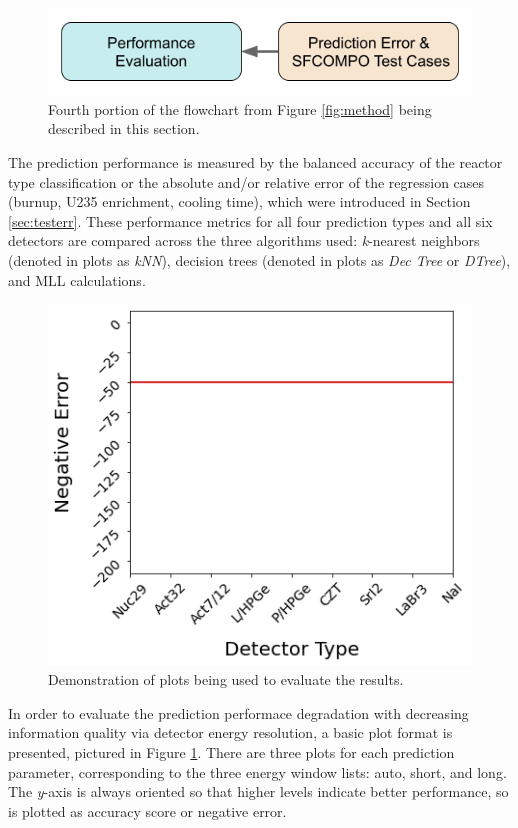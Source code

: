 

\begin{figure}[H]
  \centering
  \includegraphics[width=0.7\linewidth]{./chapters/exp1/methodology4.png}
  \caption{Fourth portion of the flowchart from Figure \ref{fig:method} being 
           described in this section.}
\end{figure}

The prediction performance is measured by the balanced accuracy of the reactor
type classification or the absolute and/or relative error of the regression
cases (burnup, \gls{U235} enrichment, cooling time), which were introduced in
Section \ref{sec:testerr}.  These performance metrics for all four prediction
types and all six detectors are compared across the three algorithms used:
\textit{k}-nearest neighbors (denoted in plots as \textit{kNN}), decision trees
(denoted in plots as \textit{Dec Tree} or \textit{DTree}), and \gls{MLL}
calculations.  

\begin{figure}[!htb]
  \centering
  \includegraphics[width=0.5\linewidth]{./chapters/exp2/exp2_plot_description.png}
  \caption{Demonstration of plots being used to evaluate the results.}
  \label{fig:detdemo}
\end{figure}

In order to evaluate the prediction performace degradation with decreasing
information quality via detector energy resolution, a basic plot format is
presented, pictured in Figure \ref{fig:detdemo}.  There are three plots for
each prediction parameter, corresponding to the three energy window lists:
auto, short, and long.  The \textit{y}-axis is always oriented so that higher
levels indicate better performance, so is plotted as accuracy score or negative
error.  

